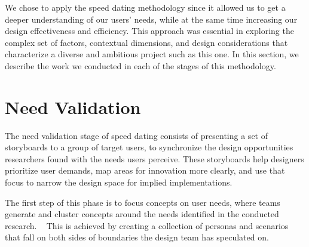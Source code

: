 We chose to apply the speed dating methodology since it allowed us to get a deeper understanding of our users' needs, while at the same time increasing our design effectiveness and efficiency. This approach was essential in exploring the complex set of factors, contextual dimensions, and design considerations that characterize a diverse and ambitious project such as this one. In this section, we describe the work we conducted in each of the stages of this methodology.

\section{Need Validation}

The need validation stage of speed dating consists of presenting a set of storyboards to a group of target users, to synchronize the design opportunities researchers found with the needs users perceive. These storyboards help designers prioritize user demands, map areas for innovation more clearly, and use that focus to narrow the design space for implied implementations. ~\cite{Davidoff2007}

The first step of this phase is to focus concepts on user needs, where teams generate and cluster concepts around the needs identified in the conducted research. ~\cite{Davidoff2007} This is achieved by creating a collection of personas and scenarios that fall on both sides of boundaries the design team has speculated on. 

